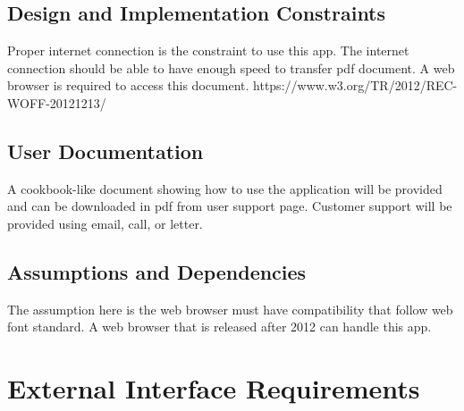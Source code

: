 \documentclass{scrreprt}
\begin{document}
\section{Design and Implementation Constraints}
Proper internet connection is the constraint to use this app. The internet connection should be  able to have enough speed to transfer pdf document. A web browser is required to access this document. 
https://www.w3.org/TR/2012/REC-WOFF-20121213/

\section{User Documentation}
A cookbook-like document showing how to use the application will be provided and can be downloaded in pdf from user support page. Customer support will be provided using email, call, or letter.

\section{Assumptions and Dependencies}
The assumption here is the web browser must have compatibility that follow web font standard. A web browser that is released after 2012 can handle this app.


\chapter{External Interface Requirements}
\end{document}
